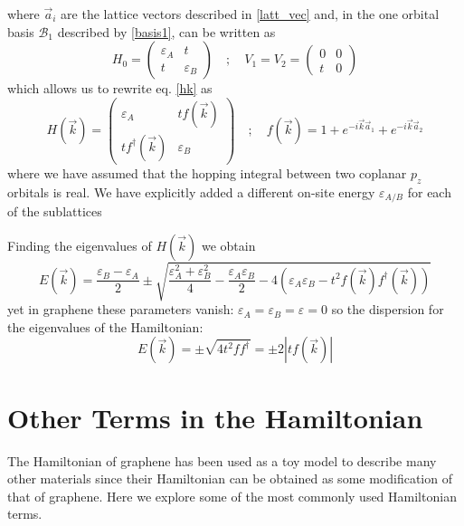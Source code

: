 where $\vec{a}_i$ are the lattice vectors described in \eqref{latt_vec} and, in the one orbital basis $\mathcal{B}_1$ described by \eqref{basis1}, can be written as
\begin{equation}
   H_0 = \left(\begin{array}{cc}
               \varepsilon_A & t \\
               t & \varepsilon_B
         \end{array}\right) \quad;\quad
   V_1 = V_2 = \left(\begin{array}{cc}
                     0 & 0 \\
                     t & 0
               \end{array}\right)
\end{equation}
which allows us to rewrite eq. \eqref{hk} as
\begin{equation}
  H(\vec{k})=\left(\begin{array}{cc}
        \varepsilon_{A} & tf(\vec{k}) \\
  tf^{\dagger}(\vec{k}) & \varepsilon_{B}
  \end{array}\right) \quad;\quad
  f(\vec{k}) = 1 + e^{-i\vec{k}\vec{a}_{1}}+
e^{-i\vec{k}\vec{a}_{2}}
\end{equation}
where we have assumed that the hopping integral between two coplanar $p_z$ orbitals is real. We have explicitly added a different on-site energy $\varepsilon_{A/B}$ for each of the sublattices

Finding the eigenvalues of $H(\vec{k})$ we obtain
\begin{equation}
  E(\vec{k})=\frac{\varepsilon_{B}-\varepsilon_{A}}{2}\pm
  \sqrt{\frac{\varepsilon^{2}_{A}+\varepsilon^{2}_{B}}{4}-
  \frac{\varepsilon_{A}\varepsilon_{B}}{2}-
  4\left(\varepsilon_{A}\varepsilon_{B}-
                                   t^2f(\vec{k})f^{\dagger}(\vec{k})\right) }
\end{equation}
yet in graphene these parameters vanish: $\varepsilon_{A}=\varepsilon_{B}=\varepsilon=0$ so the dispersion for the eigenvalues of the Hamiltonian:
\begin{equation}
  E(\vec{k})=\pm\sqrt{4t^2ff^{\dagger}} = \pm2|tf(\vec{k})|
\end{equation}

%
%
%
%
%

\section{Other Terms in the Hamiltonian}
The Hamiltonian of graphene has been used as a toy model to describe many other materials since their Hamiltonian can be obtained as some modification of that of graphene. Here we explore some of the most commonly used Hamiltonian terms.


